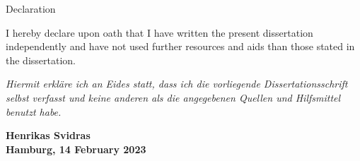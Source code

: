    \begin{abstractpage}{Declaration}
    
        I hereby declare upon oath that I have written the present dissertation independently and have not used further resources and aids than those stated in the dissertation.
        
        \textit{Hiermit erkläre ich an Eides statt, dass ich die vorliegende Dissertationsschrift selbst verfasst und keine anderen als die angegebenen Quellen und Hilfsmittel benutzt habe.}
    
        \par\bigskip
        \par\bigskip
        
        \begin{flushright}
        \par\bigskip
        \textbf{Henrikas Svidras}\\
        \textbf{Hamburg, 14 February 2023}
        \end{flushright}
        \end{abstractpage}
